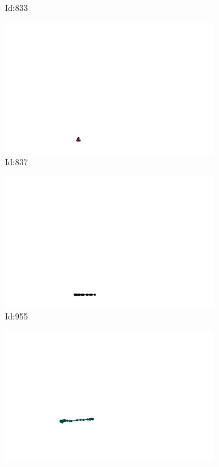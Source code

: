 \documentclass[12pt,twoside]{report}
\begin{document}
\begin{figure}
\begin{subfigure}[b]{0.20\textwidth}
\caption{Id:833}
\end{subfigure}
\begin{subfigure}[b]{0.20\textwidth}
\centering
\includegraphics[width=\textwidth]{../trajectories/837.png}
\caption{Id:837}
\end{subfigure}
\begin{subfigure}[b]{0.20\textwidth}
\centering
\includegraphics[width=\textwidth]{../trajectories/955.png}
\caption{Id:955}
\end{subfigure}
\begin{subfigure}[b]{0.20\textwidth}
\centering
\includegraphics[width=\textwidth]{../trajectories/958.png}

\end{subfigure}
\end{figure}
\end{document}
